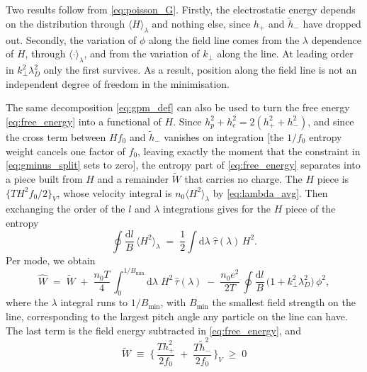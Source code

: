 \documentclass{jpp}
\newcommand{\rmd}{\text{d}}
\newcommand{\kperp}{k_\perp}
\newcommand{\lambdaD}{\lambda_D}
\newcommand{\lavg}[1]{\langle #1 \rangle_\lambda}
\begin{document}
Two results follow from \cref{eq:poisson_G}. Firstly, the electrostatic energy depends on the distribution through $\lavg{H}$ and nothing else, since $h_+$ and $\tilde h_-$ have dropped out. Secondly, the variation of $\phi$ along the field line comes from the $\lambda$ dependence of $H$, through $\lavg{\cdot}$, and from the variation of $\kperp$ along the line. At leading order in $\kperp^2\lambdaD^2$ only the first survives. As a result, position along the field line is not an independent degree of freedom in the minimisation.

The same decomposition \cref{eq:gpm_def} can also be used to turn the free energy \cref{eq:free_energy} into a functional of $H$. Since $h_p^2 + h_e^2 = 2(h_+^2 + h_-^2)$, and since the cross term between $H f_0$ and $\tilde h_-$ vanishes on integration [the $1/f_0$ entropy weight cancels one factor of $f_0$, leaving exactly the moment that the constraint in \cref{eq:gminus_split} sets to zero], the entropy part of \cref{eq:free_energy} separates into a piece built from $H$ and a remainder $\tilde{W}$ that carries no charge. The $H$ piece is $\{T H^2 f_0/2\}_{\scriptscriptstyle V}$, whose velocity integral is $n_0\lavg{H^2}$ by \cref{eq:lambda_avg}. Then exchanging the order of the $l$ and $\lambda$ integrations gives for the $H$ piece of the entropy
\begin{equation}
\oint \frac{\rmd l}{B}\,\lavg{H^2} \;=\; \frac{1}{2}\int\rmd\lambda\;\hat\tau(\lambda)\,H^2 .
\end{equation}
Per mode, we obtain
\begin{equation}\label{eq:What_decomp}
\hat W \;=\; \tilde W \;+\; \frac{n_0 T}{4}\,\int_0^{1/B_\mathrm{min}}\!\rmd\lambda\; H^2\,\hat\tau(\lambda) \;-\; \frac{n_0 e^2}{2 T}\,\oint \frac{\rmd l}{B}\,\bigl(1 + \kperp^2\lambdaD^2\bigr)\,\phi^2,
\end{equation}
where the $\lambda$ integral runs to $1/B_\mathrm{min}$, with $B_\mathrm{min}$ the smallest field strength on the line, corresponding to the largest pitch angle any particle on the line can have. The last term is the field energy subtracted in \cref{eq:free_energy}, and
\begin{equation}\label{eq:Wtilde_def}
\tilde W \;\equiv\; \biggl\{\, \frac{T h_+^2}{2 f_0} \;+\; \frac{T \tilde h_-^2}{2 f_0} \,\biggr\}_{\!{\scriptscriptstyle V}} \;\geq\; 0
\end{equation}
\end{document}
